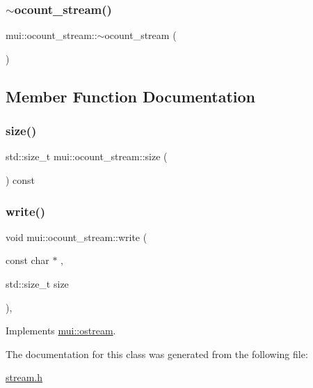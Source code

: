 \subsubsection{\texorpdfstring{$\sim$ocount\+\_\+stream()}{~ocount\_stream()}}
{\footnotesize\ttfamily mui\+::ocount\+\_\+stream\+::$\sim$ocount\+\_\+stream (\begin{DoxyParamCaption}{ }\end{DoxyParamCaption})\hspace{0.3cm}{\ttfamily [inline]}}



\subsection{Member Function Documentation}
\mbox{\label{classmui_1_1ocount__stream_a02a11f05e4411c05516e4bc2ec705128}} 
\subsubsection{\texorpdfstring{size()}{size()}}
{\footnotesize\ttfamily std\+::size\+\_\+t mui\+::ocount\+\_\+stream\+::size (\begin{DoxyParamCaption}{ }\end{DoxyParamCaption}) const\hspace{0.3cm}{\ttfamily [inline]}}

\mbox{\label{classmui_1_1ocount__stream_a7d536099a215a5546eef065634b7ea67}} 
\subsubsection{\texorpdfstring{write()}{write()}}
{\footnotesize\ttfamily void mui\+::ocount\+\_\+stream\+::write (\begin{DoxyParamCaption}\item[{const char $\ast$}]{,  }\item[{std\+::size\+\_\+t}]{size }\end{DoxyParamCaption})\hspace{0.3cm}{\ttfamily [inline]}, {\ttfamily [virtual]}}



Implements \hyperlink{classmui_1_1ostream_a93a0a1d32007efc375d885181c833995}{mui\+::ostream}.



The documentation for this class was generated from the following file\+:\begin{DoxyCompactItemize}
\item 
\hyperlink{stream_8h}{stream.\+h}\end{DoxyCompactItemize}
